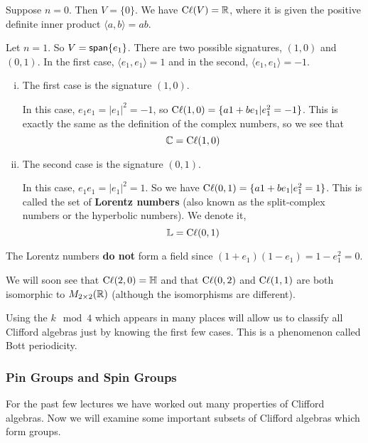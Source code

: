 \begin{example}
Suppose $n=0$. Then $V = \{0\}$. We have $\operatorname{C\ell}(V) = \operatorname{\mathbb{R}}$, where it is given the positive definite inner product $\langle a,b\rangle = ab$.
\end{example}
\begin{example}
    Let $n=1$. So $V = \operatorname{\textsf{span}}\{e_1\}$. There are two possible signatures, $(1,0)$ and $(0,1)$. In the first case, $\langle e_1,e_1\rangle = 1$ and in the second, $\langle e_1,e_1\rangle = -1$.

    \begin{enumerate}[(i)]
    \item { The first case is the signature $(1,0)$. 

    In this case, $e_1e_1 = |e_1|^2 = -1$, so $\operatorname{C\ell}(1,0) = \{a1 + be_1 | e_1^2 = -1\}$. This is exactly the same as the definition of the complex numbers, so we see that
    \[\operatorname{\mathbb{C}}=\operatorname{C\ell}(1,0) \]
    }
    \item {
    The second case is the signature $(0,1)$.

    In this case, $e_1e_1 = |e_1|^2 = 1$. So we have $\operatorname{C\ell}(0,1) = \{a1+be_1 | e_1^2 = 1 \}$. This is called the set of \textbf{Lorentz numbers} (also known as the split-complex numbers or the hyperbolic numbers). We denote it,
    \[\operatorname{\mathbb{L}} = \operatorname{C\ell}(0,1)\]
    }
    \end{enumerate}
    \begin{remark*}
        The Lorentz numbers \textbf{do not} form a field since $(1+e_1)(1-e_1) = 1-e_1^2 = 0$.
    \end{remark*}
\end{example}
\begin{example}
    We will soon see that $\operatorname{C\ell}(2,0) = \operatorname{\mathbb{H}}$ and that $\operatorname{C\ell}(0,2)$ and $\operatorname{C\ell}(1,1)$ are both isomorphic to $M_{2\times 2}(\operatorname{\mathbb{R}})$ (although the isomorphisms are different).
\end{example}
\begin{remark*}
    Using the $k\mod 4$ which appears in many places will allow us to classify all Clifford algebras just by knowing the first few cases. This is a phenomenon called Bott periodicity.
\end{remark*}

\subsubsection{Pin Groups and Spin Groups}
For the past few lectures we have worked out many properties of Clifford algebras. Now we will examine some important subsets of Clifford algebras which form groups.

